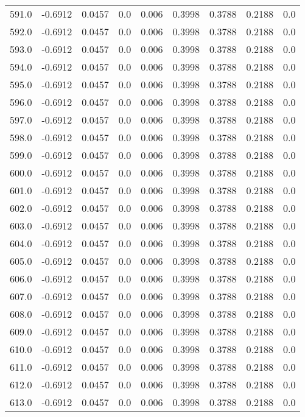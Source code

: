 \begin{longtable}{lrrrrrrrr}
591.0 & -0.6912 & 0.0457 & 0.0 & 0.006 & 0.3998 & 0.3788 & 0.2188 & 0.0 \\
592.0 & -0.6912 & 0.0457 & 0.0 & 0.006 & 0.3998 & 0.3788 & 0.2188 & 0.0 \\
593.0 & -0.6912 & 0.0457 & 0.0 & 0.006 & 0.3998 & 0.3788 & 0.2188 & 0.0 \\
594.0 & -0.6912 & 0.0457 & 0.0 & 0.006 & 0.3998 & 0.3788 & 0.2188 & 0.0 \\
595.0 & -0.6912 & 0.0457 & 0.0 & 0.006 & 0.3998 & 0.3788 & 0.2188 & 0.0 \\
596.0 & -0.6912 & 0.0457 & 0.0 & 0.006 & 0.3998 & 0.3788 & 0.2188 & 0.0 \\
597.0 & -0.6912 & 0.0457 & 0.0 & 0.006 & 0.3998 & 0.3788 & 0.2188 & 0.0 \\
598.0 & -0.6912 & 0.0457 & 0.0 & 0.006 & 0.3998 & 0.3788 & 0.2188 & 0.0 \\
599.0 & -0.6912 & 0.0457 & 0.0 & 0.006 & 0.3998 & 0.3788 & 0.2188 & 0.0 \\
600.0 & -0.6912 & 0.0457 & 0.0 & 0.006 & 0.3998 & 0.3788 & 0.2188 & 0.0 \\
601.0 & -0.6912 & 0.0457 & 0.0 & 0.006 & 0.3998 & 0.3788 & 0.2188 & 0.0 \\
602.0 & -0.6912 & 0.0457 & 0.0 & 0.006 & 0.3998 & 0.3788 & 0.2188 & 0.0 \\
603.0 & -0.6912 & 0.0457 & 0.0 & 0.006 & 0.3998 & 0.3788 & 0.2188 & 0.0 \\
604.0 & -0.6912 & 0.0457 & 0.0 & 0.006 & 0.3998 & 0.3788 & 0.2188 & 0.0 \\
605.0 & -0.6912 & 0.0457 & 0.0 & 0.006 & 0.3998 & 0.3788 & 0.2188 & 0.0 \\
606.0 & -0.6912 & 0.0457 & 0.0 & 0.006 & 0.3998 & 0.3788 & 0.2188 & 0.0 \\
607.0 & -0.6912 & 0.0457 & 0.0 & 0.006 & 0.3998 & 0.3788 & 0.2188 & 0.0 \\
608.0 & -0.6912 & 0.0457 & 0.0 & 0.006 & 0.3998 & 0.3788 & 0.2188 & 0.0 \\
609.0 & -0.6912 & 0.0457 & 0.0 & 0.006 & 0.3998 & 0.3788 & 0.2188 & 0.0 \\
610.0 & -0.6912 & 0.0457 & 0.0 & 0.006 & 0.3998 & 0.3788 & 0.2188 & 0.0 \\
611.0 & -0.6912 & 0.0457 & 0.0 & 0.006 & 0.3998 & 0.3788 & 0.2188 & 0.0 \\
612.0 & -0.6912 & 0.0457 & 0.0 & 0.006 & 0.3998 & 0.3788 & 0.2188 & 0.0 \\
613.0 & -0.6912 & 0.0457 & 0.0 & 0.006 & 0.3998 & 0.3788 & 0.2188 & 0.0 \\

\end{longtable}
